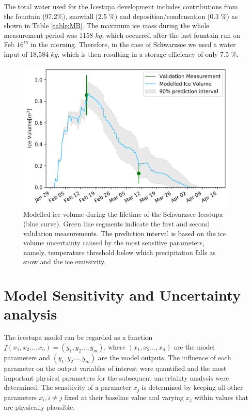 \documentclass[utf8]{frontiersSCNS} %
\begin{document}
The total water used for the Icestupa development includes contributions from the fountain (97.2\%), snowfall (2.5 \%)
and deposition/condensation (0.3 \%) as shown in Table \ref{table:MB}. The maximum ice mass during the whole measurement
period was 1158 $kg$, which occurred after the last fountain run on Feb $16^{th}$ in the morning. Therefore, in the case
of Schwarzsee we used a water input of 18,584 $kg$, which is then resulting in a storage efficiency of only 7.5 \%.

  \begin{figure} \begin{center} \includegraphics[width=15 cm]{Figures/Figure_8.jpg} \end{center} \caption{Modelled ice
    volume during the lifetime of the Schwarzsee Icestupa (blue curve). Green line segments indicate the first and
    second validation measurements. The prediction interval is based on the ice volume uncertainty caused by the most
    sensitive parameters, namely, temperature threshold below which precipitation falls as snow and the ice emissivity.}
  \label{fig:results} \end{figure}
  


\section{Model Sensitivity and Uncertainty analysis}

The icestupa model can be regarded as a function $f(x_1,x_2 \dots, x_n) = (y_1,y_2 \dots, y_m)$, where $(x_1,x_2 \dots,
x_n)$ are the model parameters and $(y_1,y_2 \dots, y_m)$ are the model outputs. The influence of each parameter on the
output variables of interest were quantified and the most important physical parameters for the subsequent uncertainty
analysis were determined. The sensitivity of a parameter $x_j$ is determined by keeping all other parameters $x_i, i
\neq j$ fixed at their baseline value and varying $x_j$ within values that are physically plausible.
\end{document}
